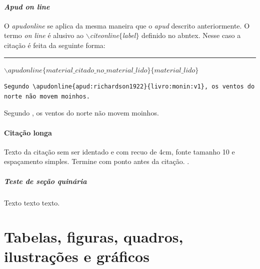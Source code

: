      \subsubsection{\textit{Apud on line}}

      
      \par O \textit{apudonline} se aplica da mesma maneira que o \textit{apud} descrito anteriormente. O termo \textit{on line} é alusivo ao \textit{$\backslash$citeonline$\{$label$\}$} definido no abntex. Nesse caso a citação é feita da seguinte forma:
      \begin{center}
      \rule{0.5\textwidth}{1pt}
            $\backslash apudonline\{material\_citado\_no\_material\_lido\}\{material\_lido\}$ \\
	    \end{center}

 \begin{verbatim}
Segundo \apudonline{apud:richardson1922}{livro:monin:v1}, os ventos do
norte não movem moinhos.
\end{verbatim}

            Segundo , os ventos do norte não movem moinhos.

\subsubsection{Citação longa}
	
	\begin{quoting}[rightmargin=0cm,leftmargin=4cm]
		\begin{singlespace}
			{\footnotesize
				\noindent Texto da citação sem ser identado e com recuo de 4cm, fonte tamanho 10 e espaçamento simples.  \lipsum[2] Termine com ponto antes da citação.  \cite{man:MDTUFSM2015}.
			}
		\end{singlespace}
	\end{quoting}

       \paragraph{Teste de seção quinária}
       
       \par Texto texto texto.
       
       
         \chapter{Tabelas, figuras, quadros, ilustrações e gráficos}
         
